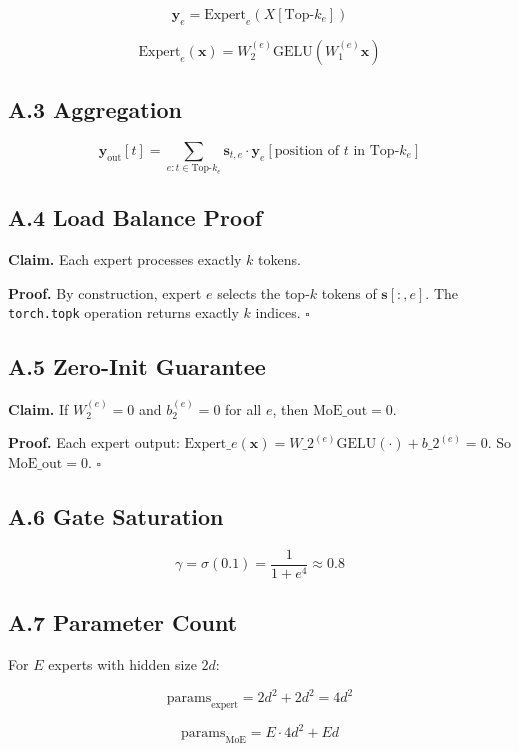 \[
\mathbf{y}_e = \text{Expert}_e(X[\text{Top-}k_e])
\tag{A.4}
\]

\[
\text{Expert}_e(\mathbf{x}) = W_2^{(e)} \text{GELU}(W_1^{(e)} \mathbf{x})
\tag{A.5}
\]

\subsection{A.3 Aggregation}

\[
\mathbf{y}_{\text{out}}[t] = \sum_{e : t \in \text{Top-}k_e} \mathbf{s}_{t, e} \cdot \mathbf{y}_e[\text{position of } t \text{ in } \text{Top-}k_e]
\tag{A.6}
\]

\subsection{A.4 Load Balance Proof}

\textbf{Claim.} Each expert processes exactly $k$ tokens.

\textbf{Proof.} By construction, expert $e$ selects the top-$k$ tokens of 
$\mathbf{s}[:, e]$. The \texttt{torch.topk} operation returns exactly $k$ 
indices. $\square$

\subsection{A.5 Zero-Init Guarantee}

\textbf{Claim.} If $W_2^{(e)} = 0$ and $b_2^{(e)} = 0$ for all $e$, then 
$\text{MoE\_out} = 0$.

\textbf{Proof.} Each expert output: $\text{Expert}\_e(\mathbf{x}) = W\_2^{(e)} 
\text{GELU}(\cdot) + b\_2^{(e)} = 0$. So $\text{MoE\_out} = 0$. $\square$

\subsection{A.6 Gate Saturation}

\[
\gamma = \sigma(0.1) = \frac{1}{1 + e^{4}} \approx 0.8
\tag{A.7}
\]

\subsection{A.7 Parameter Count}

For $E$ experts with hidden size $2d$:

\[
\text{params}_\text{expert} = 2 d^2 + 2 d^2 = 4 d^2
\tag{A.8}
\]

\[
\text{params}_\text{MoE} = E \cdot 4 d^2 + E d
\tag{A.9}
\]

